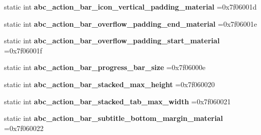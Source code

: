 \begin{DoxyCompactItemize}
static int {\bfseries abc\+\_\+action\+\_\+bar\+\_\+icon\+\_\+vertical\+\_\+padding\+\_\+material} =0x7f06001d
\item 
\mbox{\label{classandroid_1_1support_1_1graphics_1_1drawable_1_1animated_1_1R_1_1dimen_a45c7ec79cf5ada148ec0c973832572f7}} 
static int {\bfseries abc\+\_\+action\+\_\+bar\+\_\+overflow\+\_\+padding\+\_\+end\+\_\+material} =0x7f06001e
\item 
\mbox{\label{classandroid_1_1support_1_1graphics_1_1drawable_1_1animated_1_1R_1_1dimen_afb6bc0b6aa7fc88b7f63aee0788e762d}} 
static int {\bfseries abc\+\_\+action\+\_\+bar\+\_\+overflow\+\_\+padding\+\_\+start\+\_\+material} =0x7f06001f
\item 
\mbox{\label{classandroid_1_1support_1_1graphics_1_1drawable_1_1animated_1_1R_1_1dimen_ab333d76d1e82c2616f63bd420e3cad2a}} 
static int {\bfseries abc\+\_\+action\+\_\+bar\+\_\+progress\+\_\+bar\+\_\+size} =0x7f06000e
\item 
\mbox{\label{classandroid_1_1support_1_1graphics_1_1drawable_1_1animated_1_1R_1_1dimen_a95167d4f19930619596327c5f40e4d69}} 
static int {\bfseries abc\+\_\+action\+\_\+bar\+\_\+stacked\+\_\+max\+\_\+height} =0x7f060020
\item 
\mbox{\label{classandroid_1_1support_1_1graphics_1_1drawable_1_1animated_1_1R_1_1dimen_a1d105c4dad3aca18b6bb116abadbb25b}} 
static int {\bfseries abc\+\_\+action\+\_\+bar\+\_\+stacked\+\_\+tab\+\_\+max\+\_\+width} =0x7f060021
\item 
\mbox{\label{classandroid_1_1support_1_1graphics_1_1drawable_1_1animated_1_1R_1_1dimen_ae5f3c227a56d938eb1bd044cd2ebd3fb}} 
static int {\bfseries abc\+\_\+action\+\_\+bar\+\_\+subtitle\+\_\+bottom\+\_\+margin\+\_\+material} =0x7f060022
\item 
\mbox{\label{classandroid_1_1support_1_1graphics_1_1drawable_1_1animated_1_1R_1_1dimen_aa5ecad317da972878b9729e0ca46df58}} 

\end{DoxyCompactItemize}
